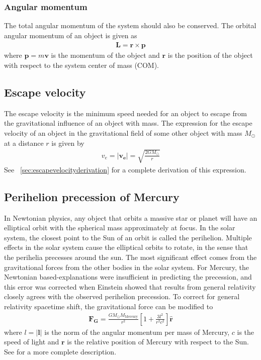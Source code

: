 \documentclass[aps,reprint]{revtex4-1}
\begin{document}
\subsubsection{Angular momentum}
The total angular momentum of the system should also be conserved. The orbital
angular momentum of an object is given as
\begin{align}
  \mathbf{L} = \mathbf{r} \times \mathbf{p}
\end{align}
where $\mathbf{p} = m \mathbf{v}$ is the momentum of the object and $\mathbf{r}$
is the position of the object with respect to the system center of mass (COM).
\subsection{Escape velocity}
The escape velocity is the minimum speed needed for an object to escape from the
gravitational influence of an object with mass. The expression for the escape
velocity of an object in the gravitational field of some other object with mass
$M_\odot$ at a distance $r$ is given by
\begin{align}
  \label{eq:escapevelocity}
  v_e = |\mathbf{v_e}| = \sqrt{\frac{2GM_\odot}{r}}
\end{align}
See ~\ref{sec:escapevelocityderivation} for a complete derivation of this expression.

\subsection{Perihelion precession of Mercury}
In Newtonian physics, any object that orbits a massive star or planet will have an elliptical orbit with
the spherical mass approximately at focus. In the solar system, the closest point to the Sun of an orbit is called
the perihelion. Multiple effects in the solar system cause the elliptical orbits to rotate, in the sense that the perihelia
precesses around the sun. The most significant effect comes from the gravitational forces from the other bodies in
the solar system. For Mercury, the Newtonian based-explanations were insufficient in predicting the precession, and
this error was corrected when Einstein showed that results from general relativity closely agrees with the observed
perihelion precession. To correct for general relativity spacetime shift, the gravitational force can be modified to
\begin{align}
\label{eq:mercuryprecession}
\mathbf{F_G} = \frac{G M_\odot M_\text{Mercury}}{r^2}\left[1 + \frac{3l^2}{r^2c^2} \right] \hat{\mathbf{r}}
\end{align}
where $l = |\mathbf{l}|$ is the norm of the angular momentum per mass of Mercury, $c$ is the speed of light and
$\mathbf{r}$ is the relative position of Mercury with respect to the Sun. See \cite{project3}
for a more complete description.
\end{document}
